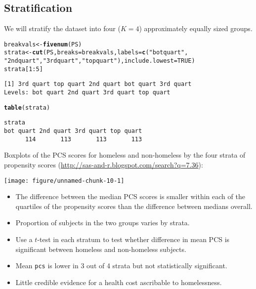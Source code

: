 \documentclass[oneside]{book}\usepackage[]{graphicx}\usepackage[svgnames]{xcolor}
\makeatletter
\def\maxwidth{ %
  \ifdim\Gin@nat@width>\linewidth
    \linewidth
  \else
    \Gin@nat@width
  \fi
}
\newcommand{\hlnum}[1]{\textcolor[rgb]{0.686,0.059,0.569}{#1}}%
\newcommand{\hlstr}[1]{\textcolor[rgb]{0.192,0.494,0.8}{#1}}%
\newcommand{\hlopt}[1]{\textcolor[rgb]{0,0,0}{#1}}%
\newcommand{\hlstd}[1]{\textcolor[rgb]{0.345,0.345,0.345}{#1}}%
\newcommand{\hlkwb}[1]{\textcolor[rgb]{0.69,0.353,0.396}{#1}}%
\newcommand{\hlkwc}[1]{\textcolor[rgb]{0.333,0.667,0.333}{#1}}%
\newcommand{\hlkwd}[1]{\textcolor[rgb]{0.737,0.353,0.396}{\textbf{#1}}}%
\newenvironment{kframe}{%
 \def\at@end@of@kframe{}%
 \ifinner\ifhmode%
  \def\at@end@of@kframe{\end{minipage}}%
  \begin{minipage}{\columnwidth}%
 \fi\fi%
 \def\FrameCommand##1{\hskip\@totalleftmargin \hskip-\fboxsep
 \colorbox{shadecolor}{##1}\hskip-\fboxsep
     \hskip-\linewidth \hskip-\@totalleftmargin \hskip\columnwidth}%
 \MakeFramed {\advance\hsize-\width
   \@totalleftmargin\z@ \linewidth\hsize
   \@setminipage}}%
 {\par\unskip\endMakeFramed%
 \at@end@of@kframe}
\newenvironment{knitrout}{}{} %
\makeatother
\begin{document}
\subsection{Stratification}
We will stratify the dataset into four ($K=4$) approximately equally
sized groups.
\begin{knitrout}
\color{fgcolor}\begin{kframe}
\begin{alltt}
\hlstd{breakvals} \hlkwb{<-} \hlkwd{fivenum}\hlstd{(PS)}
\hlstd{strata} \hlkwb{<-} \hlkwd{cut}\hlstd{(PS,} \hlkwc{breaks} \hlstd{= breakvals,} \hlkwc{labels} \hlstd{=} \hlkwd{c}\hlstd{(}\hlstr{"bot quart"}\hlstd{,}
  \hlstr{"2nd quart"}\hlstd{,} \hlstr{"3rd quart"}\hlstd{,} \hlstr{"top quart"}\hlstd{),} \hlkwc{include.lowest} \hlstd{=} \hlnum{TRUE}\hlstd{)}
\hlstd{strata[}\hlnum{1}\hlopt{:}\hlnum{5}\hlstd{]}
\end{alltt}
\begin{verbatim}
[1] 3rd quart top quart 2nd quart bot quart 3rd quart
Levels: bot quart 2nd quart 3rd quart top quart
\end{verbatim}
\begin{alltt}
\hlkwd{table}\hlstd{(strata)}
\end{alltt}
\begin{verbatim}
strata
bot quart 2nd quart 3rd quart top quart 
      114       113       113       113 
\end{verbatim}
\end{kframe}
\end{knitrout}
Boxplots of the PCS scores for homeless and non-homeless by the
four strata of propensity scores (\url{http://sas-and-r.blogspot.com/search?q=7.36}):
\begin{knitrout}
\color{fgcolor}

{\centering \texttt{[image: figure/unnamed-chunk-10-1]} 

}


\end{knitrout}
\begin{itemize}
      \item The difference between the median PCS scores is smaller
            within each of the quartiles of the propensity scores than the
            difference between medians overall.
      \item Proportion of subjects in the two groups varies by strata.
      \item Use a $t$-test in each stratum to test whether difference in mean
            PCS is significant between homeless and non-homeless
            subjects.
      \item Mean \texttt{pcs} is lower in 3 out of 4 strata but not statistically
            significant.
      \item Little credible evidence for a health cost ascribable to
            homelessness.
\end{itemize}
\end{document}

